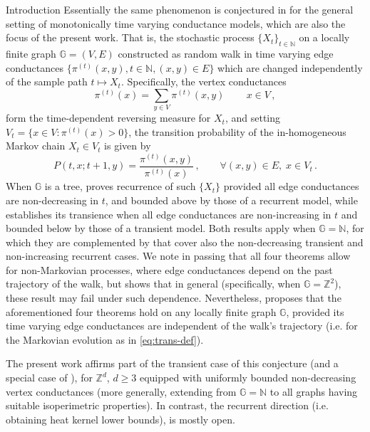 \documentclass[12pt,reqno]{amsart}
\numberwithin{equation}{section}
\theoremstyle{definition}
\begin{document}
\begin{section}{Introduction}
Essentially the same phenomenon is conjectured
in \cite{ABGK} for the general setting of monotonically time varying 
conductance models, which are also the focus of the present work. That is,
the stochastic process $\{X_t\}_{t \in {\mathbb{N}}}$ on a locally finite graph ${\mathbb{G}}=(V,E)$ constructed as 
random walk in time varying edge conductances $\{\pi^{(t)}(x,y), t \in {\mathbb{N}}, (x,y) \in E\}$ 
which are changed independently of the sample path $t \mapsto X_t$. 
Specifically, the vertex conductances 
\begin{equation}\label{eq:vert-cond-def}
\pi^{(t)}(x)=\sum_{y \in V} \pi^{(t)}(x,y)\, \qquad x \in V \,, 
\end{equation} 
form the time-dependent reversing measure for $X_t$, and setting
$V_t = \{x \in V: \pi^{(t)}(x) > 0 \}$, the transition probability 
of the 
in-homogeneous Markov chain $X_t \in V_t$ is given by
\begin{equation}\label{eq:trans-def} 
P(t,x;t+1,y)=\frac{\pi^{(t)}(x,y)}{\pi^{(t)}(x)} \,, \qquad \forall (x,y) \in E, 
\; x \in V_t\,.
\end{equation} 
When ${\mathbb{G}}$ is a tree, \cite[Theorems 5.1]{ABGK} proves recurrence of such $\{X_t\}$
provided all edge conductances 
are non-decreasing in $t$,
and bounded above by those of a recurrent model, while \cite[Theorem 5.2]{ABGK}
establishes its transience when all edge conductances are non-increasing in $t$
and bounded below by those of a transient model. Both results apply when ${\mathbb{G}}={\mathbb{N}}$,
for which they are complemented 
by \cite[Theorems 4.2 and 4.4]{ABGK} that cover also the non-decreasing 
transient and non-increasing recurrent cases. We note in passing that all
four theorems 
allow for non-Markovian processes, where 
edge conductances depend on the past trajectory of the walk, but 
\cite[Section 6]{ABGK} shows that in general (specifically, 
when ${\mathbb{G}}={\mathbb{Z}}^2$), these result may fail under such dependence. Nevertheless, 
\cite[Conj. 7.1]{ABGK} proposes that the aforementioned four theorems 
hold on any locally finite graph ${\mathbb{G}}$, provided its time varying edge 
conductances are independent of the walk's trajectory (i.e. for the 
Markovian evolution as in \eqref{eq:trans-def}).

The present work affirms part of
the transient case of this conjecture
(and a special case of 
\cite[Conj. 1.8]{DHS}), 
for ${\mathbb{Z}}^d$, $d\ge3$
equipped with uniformly bounded non-decreasing vertex conductances (more generally,
extending \cite[Theorem 4.2]{ABGK} from ${\mathbb{G}}={\mathbb{N}}$ to all graphs having 
suitable isoperimetric properties). In contrast, the recurrent direction 
(i.e. obtaining heat kernel lower bounds), is mostly open. 


\end{section}
\end{document}

